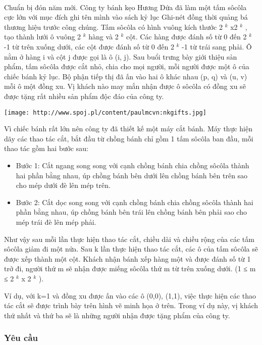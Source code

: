 

 

Chuẩn bị đón năm mới. Công ty bánh kẹo Hương Dứa đã làm một tấm sôcôla cực lớn với mục đích ghi tên mình vào sách kỷ lục Ghi-nét đồng thời quảng bá thương hiệu trước công chúng. Tấm sôcôla có hình vuông kích thước 2 $^ k $ x2 $^ k $ , tạo thành lưới ô vuông 2 $^ k $ hàng và 2 $^ k $ cột. Các hàng được đánh số từ 0 đến 2 $^ k $ -1 từ trên xuống dưới, các cột được đánh số từ 0 đến 2 $^ k $ -1 từ trái sang phải. Ô nằm ở hàng i và cột j được gọi là ô (i, j). Sau buổi trưng bày giới thiệu sản phẩm, tấm sôcôla được cắt nhỏ, chia cho mọi người, mỗi người được một ô của chiếc bánh kỷ lục. Bộ phận tiếp thị đã ấn vào hai ô khác nhau (p, q) và (u, v) mỗi ô một đồng xu. Vị khách nào may mắn nhận được ô sôcôla có đồng xu sẽ được tặng rất nhiều sản phẩm độc đáo của công ty.


\texttt{[image: http://www.spoj.pl/content/paulmcvn:nkgifts.jpg]}

Vì chiếc bánh rất lớn nên công ty đã thiết kế một máy cắt bánh. Máy thực hiện dãy các thao tác cắt, bắt đầu từ chồng bánh chỉ gồm 1 tấm sôcôla ban đầu, mỗi thao tác gồm hai bước sau:
\begin{itemize}
	\item Bước 1: Cắt ngang song song với cạnh chồng bánh chia chồng sôcôla thành hai phần bằng nhau, úp chồng bánh bên dưới lên chồng bánh bên trên sao cho mép dưới đè lên mép trên.
	\item Bước 2: Cắt dọc song song với cạnh chồng bánh chia chồng sôcôla thành hai phần bằng nhau, úp chồng bánh bên trái lên chồng bánh bên phải sao cho mép trái đè lên mép phải.
\end{itemize}

Như vậy sau mỗi lần thực hiện thao tác cắt, chiều dài và chiều rộng của các tấm sôcôla giảm đi một nửa. Sau k lần thực hiện thao tác cắt, các ô của tấm sôcôla sẽ được xếp thành một cột. Khách nhận bánh xếp hàng một và được đánh số từ 1 trở đi, người thứ m sẽ nhận được miếng sôcôla thứ m từ trên xuống dưới. (1 ≤ m ≤ 2 $^ k $ x 2 $^ k $ ).

Ví dụ, với k=1 và đồng xu được ấn vào các ô (0,0), (1,1), việc thực hiện các thao tác cắt sẽ được trình bày trên hình vẽ minh họa ở trên. Trong ví dụ này, vị khách thứ nhất và thứ ba sẽ là những người nhận được tặng phẩm của công ty.

\subsubsection{Yêu cầu}


